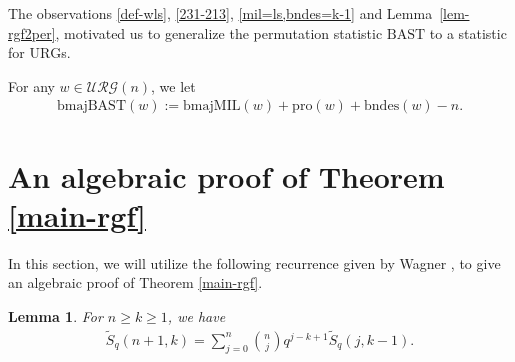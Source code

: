 \documentclass[12pt]{amsart}
\numberwithin{equation}{section}
\theoremstyle{plain}
\newtheorem{lemma}[theorem]{Lemma}
\theoremstyle{definition}
\def\BAST{\mathrm{BAST}}
\def\bmajMIL{\mathrm{bmajMIL}}
\def\bmajBAST{\mathrm{bmajBAST}}
\def\bndes{\mathrm{bndes}}
\def\pl{\mathrm{pro}}
\def\URG{\mathcal{URG}}
\begin{document}
The observations \eqref{def-wls}, \eqref{231-213}, \eqref{mil=ls,bndes=k-1} and Lemma~\ref{lem-rgf2per}, motivated us to generalize the permutation statistic $\BAST$ to a statistic for $\mathrm{URG}$s.

For any $w\in\URG(n)$, we let
\begin{align}\label{def-bmajbast}
\bmajBAST(w):=\bmajMIL(w)+\pl(w)+\bndes(w)-n.
\end{align}

\section{An algebraic proof of Theorem \ref{main-rgf} }\label{sec:algebra}
 In this section, we will utilize the following recurrence given by Wagner \cite{Wa1996}, to give an algebraic proof of Theorem \ref{main-rgf}.

 \begin{lemma}
 For $n \geq k \geq 1$, we have
 \begin{align}
   \widetilde{S}_q(n+1,k)=\sum_{j=0}^n {\binom{n}{j}} q^{j-k+1} \widetilde{S}_q(j,k-1).\label{recur2}
 \end{align}
 \end{lemma}
\end{document}
